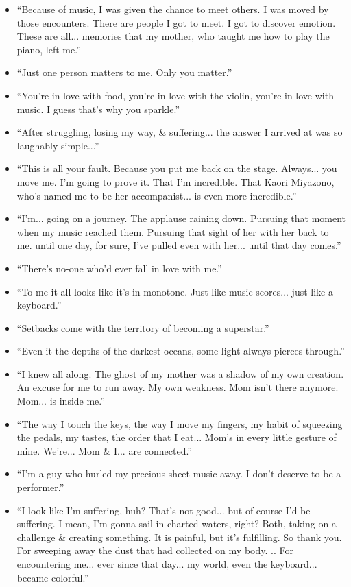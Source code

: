 \documentclass{article}
\begin{document}
\begin{enumerate}
\begin{itemize}
    	\item ``Because of music, I was given the chance to meet others. I was moved by those encounters. There are people I got to meet. I got to discover emotion. These are all... memories that my mother, who taught me how to play the piano, left me.''
    	\item ``Just one person matters to me. Only you matter.''
    	\item ``You're in love with food, you're in love with the violin, you're in love with music. I guess that's why you sparkle.''
    	\item ``After struggling, losing my way, \& suffering... the answer I arrived at was so laughably simple...''
    	\item ``This is all your fault. Because you put me back on the stage. Always... you move me. I'm going to prove it. That I'm incredible. That Kaori Miyazono, who's named me to be her accompanist... is even more incredible.''
    	\item ``I'm... going on a journey. The applause raining down. Pursuing that moment when my music reached them. Pursuing that sight of her with her back to me. until one day, for sure, I've pulled even with her... until that day comes.''
    	\item ``There's no-one who'd ever fall in love with me.''
    	\item ``To me it all looks like it's in monotone. Just like music scores... just like a keyboard.''
    	\item ``Setbacks come with the territory of becoming a superstar.''
    	\item ``Even it the depths of the darkest oceans, some light always pierces through.''
    	\item ``I knew all along. The ghost of my mother was a shadow of my own creation. An excuse for me to run away. My own weakness. Mom isn't there anymore. Mom... is inside me.''
    	\item ``The way I touch the keys, the way I move my fingers, my habit of squeezing the pedals, my tastes, the order that I eat... Mom's in every little gesture of mine. We're... Mom \& I... are connected.''
    	\item ``I'm a guy who hurled my precious sheet music away. I don't deserve to be a performer.''
    	\item ``I look like I'm suffering, huh? That's not good... but of course I'd be suffering. I mean, I'm gonna sail in charted waters, right? Both, taking on a challenge \& creating something. It is painful, but it's fulfilling. So thank you. For sweeping away the dust that had collected on my body. .. For encountering me... ever since that day... my world, even the keyboard... became colorful.''

\end{itemize}
\end{enumerate}
\end{document}
